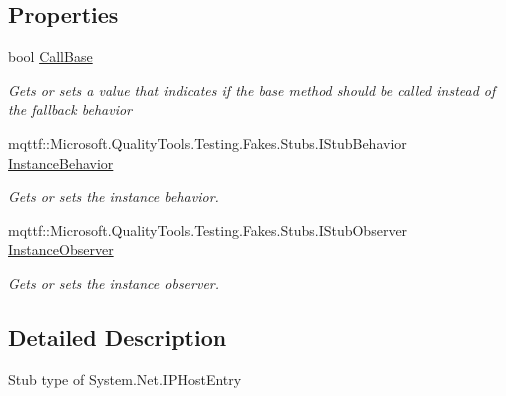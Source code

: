 \subsection*{Properties}
\begin{DoxyCompactItemize}
\item 
bool \hyperlink{class_system_1_1_net_1_1_fakes_1_1_stub_i_p_host_entry_a96a0cd81f008a1178d5119aaeeeb44e9}{Call\-Base}
\begin{DoxyCompactList}\small\item\em Gets or sets a value that indicates if the base method should be called instead of the fallback behavior\end{DoxyCompactList}\item 
mqttf\-::\-Microsoft.\-Quality\-Tools.\-Testing.\-Fakes.\-Stubs.\-I\-Stub\-Behavior \hyperlink{class_system_1_1_net_1_1_fakes_1_1_stub_i_p_host_entry_aa5934ce50110dc58dcb2920201f62fee}{Instance\-Behavior}
\begin{DoxyCompactList}\small\item\em Gets or sets the instance behavior.\end{DoxyCompactList}\item 
mqttf\-::\-Microsoft.\-Quality\-Tools.\-Testing.\-Fakes.\-Stubs.\-I\-Stub\-Observer \hyperlink{class_system_1_1_net_1_1_fakes_1_1_stub_i_p_host_entry_ad0acecc7aa39106c5df7d0558d5b7fdc}{Instance\-Observer}
\begin{DoxyCompactList}\small\item\em Gets or sets the instance observer.\end{DoxyCompactList}\end{DoxyCompactItemize}


\subsection{Detailed Description}
Stub type of System.\-Net.\-I\-P\-Host\-Entry



